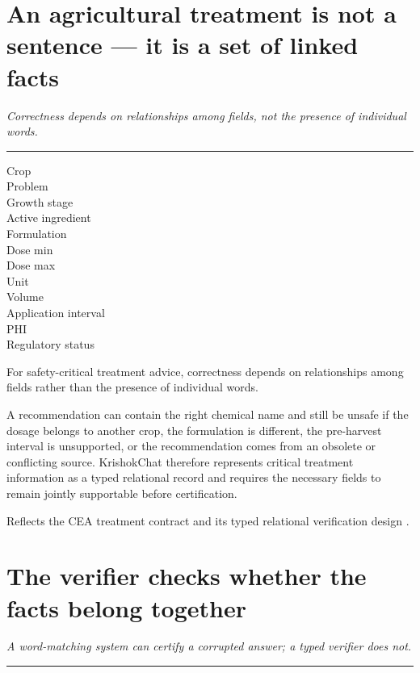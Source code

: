 \documentclass[11pt,a4paper]{article}
\newcommand{\takeaway}[1]{{\color{kcgrey}\itshape\large #1}\par\vspace{2pt}%
  {\color{kcline}\rule{\linewidth}{0.8pt}}\par\vspace{6pt}}
\newcommand{\srcfoot}[1]{\par\vspace{4pt}{\color{kcline}\rule{\linewidth}{0.4pt}}\par
  {\footnotesize\color{kcgrey}#1}\par}
\begin{document}
\section*{\color{kcgreen}An agricultural treatment is not a sentence --- it is a set of linked facts}
\takeaway{Correctness depends on relationships among fields, not the presence of individual words.}

\begin{minipage}[t]{0.42\linewidth}
\begin{tcolorbox}[colback=white,colframe=kcgreen,title={\bfseries Agricultural Treatment Record},
  coltitle=white,colbacktitle=kcgreen,fonttitle=\bfseries]
\footnotesize
Crop \\ Problem \\ Growth stage \\ Active ingredient \\ Formulation \\ Dose min \\
Dose max \\ Unit \\ Volume \\ Application interval \\ PHI \\ Regulatory status
\end{tcolorbox}
\end{minipage}\hfill
\begin{minipage}[t]{0.54\linewidth}
For safety-critical treatment advice, correctness depends on relationships among
fields rather than the presence of individual words.

\vspace{4pt}
A recommendation can contain the right chemical name and still be unsafe if the
dosage belongs to another crop, the formulation is different, the pre-harvest
interval is unsupported, or the recommendation comes from an obsolete or
conflicting source. KrishokChat therefore represents critical treatment
information as a typed relational record and requires the necessary fields to
remain jointly supportable before certification.
\end{minipage}

\srcfoot{Reflects the CEA treatment contract and its typed relational verification design \cite{cea_manuscript}.}

\newpage
\section*{\color{kcgreen}The verifier checks whether the facts belong together}
\takeaway{A word-matching system can certify a corrupted answer; a typed verifier does not.}
\end{document}
